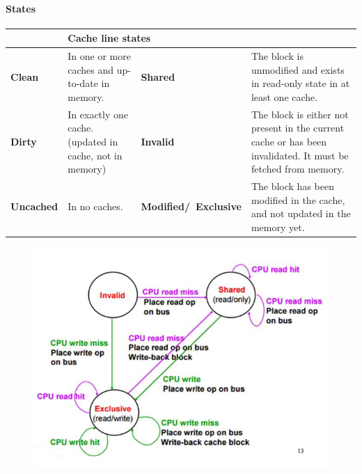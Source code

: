 			\paragraph{States}
			\begin{table}[H]\centering
				\begin{tabular}{|>{\bfseries}p{}|p{}|>{\bfseries}p{}|p{}|}
					\hline
					\multicolumn{2}{|l|}{\textbf{Memory block states}}
						& \multicolumn{2}{|l|}{\textbf{Cache line states}}\\
					\hline
					Clean
						& In one or more caches and up-to-date in memory.
						& Shared
						& The block is unmodified and exists in read-only state in at least one cache.\\
					\hline
					Dirty
						& In exactly one cache. (updated in cache, not in memory)
						& Invalid
						& The block is either not present in the current cache or has been invalidated. It must be fetched from memory.\\
					\hline
					Uncached
						& In no caches.
						& Modified/\newline\ Exclusive
						& The block has been modified in the cache, and not updated in the memory yet.\\
					\hline
				\end{tabular}
			\end{table}
			
			\begin{figure}[H]\centering
				\includegraphics[scale=0.5]{./pictures/MSIProtocol.png}
			\end{figure}
			
